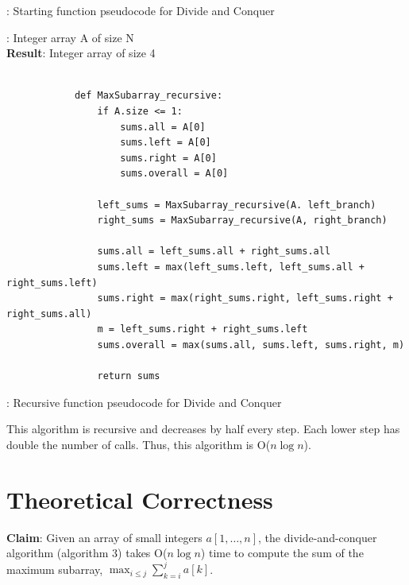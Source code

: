 \documentclass[a4paper,10pt]{article}
\begin{document}
			\begin{center}
			: Starting function pseudocode for Divide and Conquer
			\end{center}

			\vspace{1em}
			
			: Integer array A of size N \\
			{\bf Result}: Integer array of size 4

			\begin{minipage}[!h]{6in}
			\begin{verbatim}

			def MaxSubarray_recursive:
			    if A.size <= 1:
			        sums.all = A[0]
			        sums.left = A[0]
			        sums.right = A[0]
			        sums.overall = A[0]

			    left_sums = MaxSubarray_recursive(A. left_branch)
			    right_sums = MaxSubarray_recursive(A, right_branch)

			    sums.all = left_sums.all + right_sums.all
			    sums.left = max(left_sums.left, left_sums.all + right_sums.left)
			    sums.right = max(right_sums.right, left_sums.right + right_sums.all)
			    m = left_sums.right + right_sums.left
			    sums.overall = max(sums.all, sums.left, sums.right, m)

			    return sums
			\end{verbatim}
			\end{minipage}

			\begin{center}
			: Recursive function pseudocode for Divide and Conquer
			\end{center}

			\vspace{1em}

			\noindent This algorithm is recursive and decreases by half every step. Each lower step has double the number of calls. Thus, this algorithm is O($n \log n$).


	\section{Theoretical Correctness}

		{\bf Claim}: Given an array of small integers $a[1, \dots, n]$, the divide-and-conquer algorithm (algorithm 3) takes O($n \log n$) time to compute the sum of the maximum subarray, $\displaystyle \max_{i\leq{j}} \sum_{k=i}^j a[k]$.
\end{document}
